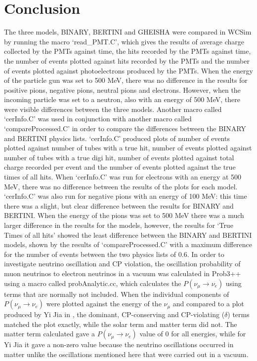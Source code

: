 \documentclass[11pt,oneside,a4paper]{article}
\begin{document}
\section{Conclusion}

The three models, BINARY, BERTINI and GHEISHA were compared in WCSim by running the macro `read\_PMT.C', which gives the results of average charge collected by the PMTs against time, the hits recorded by the PMTs against time, the number of events plotted against hits recorded by the PMTs and the number of events plotted against photoelectrons produced by the PMTs. When the energy of the particle gun was set to 500 MeV, there was no difference in the results for positive pions, negative pions, neutral pions and electrons. However, when the incoming particle was set to a neutron, also with an energy of 500 MeV, there were visible differences between the three models. Another macro called `cerInfo.C' was used in conjunction with another macro called `compareProcessed.C' in order to compare the differences between the BINARY and BERTINI physics lists. `cerInfo.C' produced plots of number of events plotted against number of tubes with a true hit, number of events plotted against number of tubes with a true digi hit, number of events plotted against total charge recorded per event and the number of events plotted against the true times of all hits. When `cerInfo.C' was run for electrons with an energy at 500 MeV, there was no difference between the results of the plots for each model. `cerInfo.C' was also run for negative pions with an energy of 100 MeV: this time there was a slight, but clear difference between the results for BINARY and BERTINI. When the energy of the pions was set to 500 MeV there was a much larger difference in the results for the models, however, the results for `True Times of all hits' showed the least difference between the BINARY and BERTINI models, shown by the results of `compareProcessed.C' with a maximum difference for the number of events between the two physics lists of 0.6. In order to investigate neutrino oscillation and CP violation, the oscillation probability of muon neutrinos to electron neutrinos in a vacuum was calculated in Prob3++ using a macro called probAnalytic.cc, which calculates the $P(\nu_{\mu} \rightarrow \nu_{e})$ using terms that are normally not included. When the individual components of $P(\nu_{\mu} \rightarrow \nu_{e})$ were plotted against the energy of the $\nu_{\mu}$ and compared to a plot produced by Yi Jia in \cite{yijiapaper}, the dominant, CP-conserving and CP-violating ($\delta$) terms matched the plot exactly, while the solar term and matter term did not. The matter term calculated gave a $P(\nu_{\mu} \rightarrow \nu_{e})$ value of 0 for all energies, while for Yi Jia it gave a non-zero value because the neutrino oscillations occurred in matter unlike the oscillations mentioned here that were carried out in a vacuum.
\end{document}
